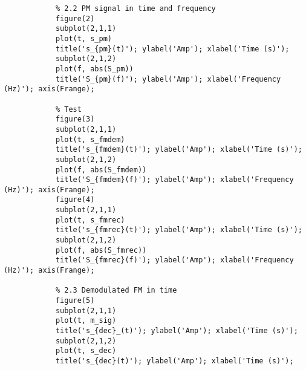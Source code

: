 \documentclass{article}
\begin{document}
\begin{verbatim}
            % 2.2 PM signal in time and frequency
            figure(2)
            subplot(2,1,1)
            plot(t, s_pm)
            title('s_{pm}(t)'); ylabel('Amp'); xlabel('Time (s)');
            subplot(2,1,2)
            plot(f, abs(S_pm))
            title('S_{pm}(f)'); ylabel('Amp'); xlabel('Frequency (Hz)'); axis(Frange);
            
            % Test
            figure(3)
            subplot(2,1,1)
            plot(t, s_fmdem)
            title('s_{fmdem}(t)'); ylabel('Amp'); xlabel('Time (s)');
            subplot(2,1,2)
            plot(f, abs(S_fmdem))
            title('S_{fmdem}(f)'); ylabel('Amp'); xlabel('Frequency (Hz)'); axis(Frange);
            figure(4)
            subplot(2,1,1)
            plot(t, s_fmrec)
            title('s_{fmrec}(t)'); ylabel('Amp'); xlabel('Time (s)');
            subplot(2,1,2)
            plot(f, abs(S_fmrec))
            title('S_{fmrec}(f)'); ylabel('Amp'); xlabel('Frequency (Hz)'); axis(Frange);
            
            % 2.3 Demodulated FM in time
            figure(5)
            subplot(2,1,1)
            plot(t, m_sig)
            title('s_{dec}_(t)'); ylabel('Amp'); xlabel('Time (s)');
            subplot(2,1,2)
            plot(t, s_dec)
            title('s_{dec}(t)'); ylabel('Amp'); xlabel('Time (s)');
        \end{verbatim}
\end{document}
